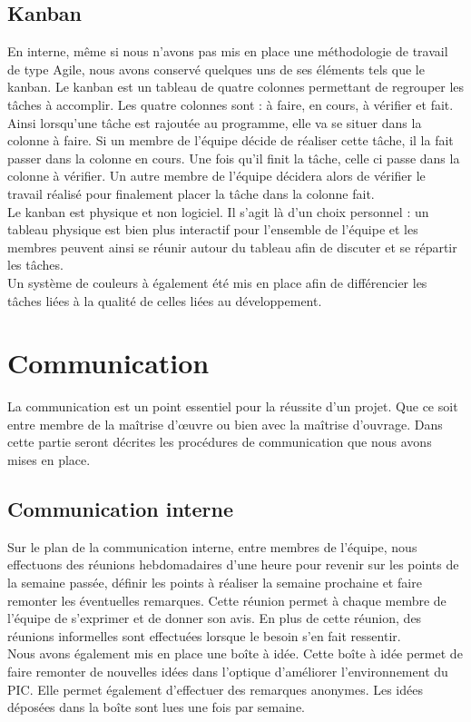 \documentclass[asi]{picInsa}
\begin{document}
\subsection{Kanban}
En interne, même si nous n'avons pas mis en place une méthodologie de travail de type Agile, nous avons conservé quelques uns de ses éléments tels que le kanban. Le kanban est un tableau de quatre colonnes permettant de regrouper les tâches à accomplir. Les quatre colonnes sont : à faire, en cours, à vérifier et fait. Ainsi lorsqu'une tâche est rajoutée au programme, elle va se situer dans la colonne à faire. Si un membre de l'équipe décide de réaliser cette tâche, il la fait passer dans la colonne en cours. Une fois qu'il finit la tâche, celle ci passe dans la colonne à vérifier. Un autre membre de l'équipe décidera alors de vérifier le travail réalisé pour finalement placer la tâche dans la colonne fait.\\
Le kanban est physique et non logiciel. Il s'agit là d'un choix personnel : un tableau physique est bien plus interactif pour l'ensemble de l'équipe et les membres peuvent ainsi se réunir autour du tableau afin de discuter et se répartir les tâches.\\
Un système de couleurs à également été mis en place afin de différencier les tâches liées à la qualité de celles liées au développement.



\section{Communication}
La communication est un point essentiel pour la réussite d'un projet. Que ce soit entre membre de la maîtrise d’œuvre ou bien avec la maîtrise d'ouvrage. Dans cette partie seront décrites les procédures de communication que nous avons mises en place.

\subsection{Communication interne}
Sur le plan de la communication interne, entre membres de l'équipe, nous effectuons des réunions hebdomadaires d'une heure pour revenir sur les points de la semaine passée, définir les points à réaliser la semaine prochaine et faire remonter les éventuelles remarques. Cette réunion permet à chaque membre de l'équipe de s'exprimer et de donner son avis. En plus de cette réunion, des réunions informelles sont effectuées lorsque le besoin s'en fait ressentir.\vspace{0.5cm}\\
Nous avons également mis en place une boîte à idée. Cette boîte à idée permet de faire remonter de nouvelles idées dans l'optique d'améliorer l'environnement du PIC. Elle permet également d'effectuer des remarques anonymes. Les idées déposées dans la boîte sont lues une fois par semaine.
\end{document}
